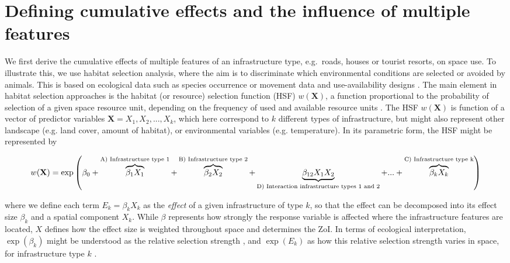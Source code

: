 \documentclass[titlepage]{article}
\begin{document}
\section{Defining cumulative effects and the influence of multiple features}

We first derive the cumulative effects of multiple features of an infrastructure type, e.g.\ roads, houses or tourist resorts, on space use. To illustrate this, we use habitat selection analysis, where the aim is to discriminate which environmental conditions are selected or avoided by animals. This is based on ecological data such as species occurrence or movement data and use-availability designs \citep{fieberg_how_2021}. The main element in habitat selection approaches is the habitat (or resource) selection function (HSF) $w(\textbf{X})$, a function proportional to the probability of selection of a given space resource unit, depending on the frequency of used and available resource units \citep{thurfjell_applications_2014}. The HSF $w(\textbf{X})$ is function of a vector of predictor variables $\textbf{X} = X_1,X_2, ...,  X_k$, which here correspond to $k$ different types of infrastructure, but might also represent other landscape (e.g. land cover, amount of habitat), or environmental variables (e.g. temperature). In its parametric form, the HSF might be represented by

\begin{equation}
\centering
\label{eqn:HSF}
    w(\textbf{X}) %
                  = \exp \left( \beta_0 + \overbrace{\beta_1 X_1}^\text{A) Infrastructure type 1} + \overbrace{\beta_2 X_2}^\text{B) Infrastructure type 2} + \underbrace{\beta_{12} X_1 X_2}_\text{D) Interaction infrastructure types 1 and 2} + ... + \overbrace{\beta_k X_k}^\text{C) Infrastructure type k} \right)
\end{equation}

where we define each term $E_k = \beta_k X_k$ as the \textit{effect} of a given infrastructure of type $k$, so that the effect can be decomposed into its effect size $\beta_k$ and a spatial component $X_k$. While $\beta$ represents how strongly the response variable is affected where the infrastructure features are located, $X$ defines how the effect size is weighted throughout space and determines the ZoI. In terms of ecological interpretation, $\exp(\beta_k)$ might be understood as the relative selection strength \citep{avgar_relative_2017}, and $\exp(E_k)$ as how this relative selection strength varies in space, for infrastructure type $k$ \citep{fieberg_how_2021}.
\end{document}
